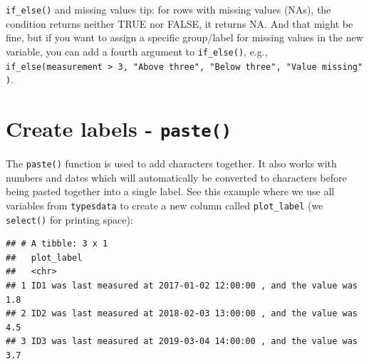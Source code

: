 \documentclass[
  12pt,
  krantz2]{krantz}
\makeatletter
\newenvironment{Shaded}{\begin{snugshade}}{\end{snugshade}}
\newcommand{\DataTypeTok}[1]{\textcolor[rgb]{0.13,0.29,0.53}{#1}}
\newcommand{\KeywordTok}[1]{\textcolor[rgb]{0.13,0.29,0.53}{\textbf{#1}}}
\newcommand{\NormalTok}[1]{#1}
\newcommand{\OperatorTok}[1]{\textcolor[rgb]{0.81,0.36,0.00}{\textbf{#1}}}
\newcommand{\StringTok}[1]{\textcolor[rgb]{0.31,0.60,0.02}{#1}}
\renewenvironment{quote}{\begin{VF}}{\end{VF}}
\newenvironment{kframe}{%
\medskip{}
\setlength{\fboxsep}{.8em}
 \def\at@end@of@kframe{}%
 \ifinner\ifhmode%
  \def\at@end@of@kframe{\end{minipage}}%
  \begin{minipage}{\columnwidth}%
 \fi\fi%
 \def\FrameCommand##1{\hskip\@totalleftmargin \hskip-\fboxsep
 \colorbox{shadecolor}{##1}\hskip-\fboxsep
     \hskip-\linewidth \hskip-\@totalleftmargin \hskip\columnwidth}%
 \MakeFramed {\advance\hsize-\width
   \@totalleftmargin\z@ \linewidth\hsize
   \@setminipage}}%
 {\par\unskip\endMakeFramed%
 \at@end@of@kframe}
\renewenvironment{Shaded}{\begin{kframe}}{\end{kframe}}
\makeatother
\begin{document}
\begin{quote}
\texttt{if\_else()} and missing values tip: for rows with missing values (NAs), the condition returns neither TRUE nor FALSE, it returns NA.
And that might be fine, but if you want to assign a specific group/label for missing values in the new variable, you can add a fourth argument to \texttt{if\_else()}, e.g., \texttt{if\_else(measurement\ \textgreater{}\ 3,\ "Above\ three",\ "Below\ three",\ "Value\ missing")}.
\end{quote}

\hypertarget{create-labels---paste}{%
\section{\texorpdfstring{Create labels - \texttt{paste()}}{Create labels - paste()}}\label{create-labels---paste}}


The \texttt{paste()} function is used to add characters together.
It also works with numbers and dates which will automatically be converted to characters before being pasted together into a single label.
See this example where we use all variables from \texttt{typesdata} to create a new column called \texttt{plot\_label} (we \texttt{select()} for printing space):

\begin{Shaded}
\end{Shaded}

\begin{verbatim}
## # A tibble: 3 x 1
##   plot_label                                                          
##   <chr>                                                               
## 1 ID1 was last measured at 2017-01-02 12:00:00 , and the value was 1.8
## 2 ID2 was last measured at 2018-02-03 13:00:00 , and the value was 4.5
## 3 ID3 was last measured at 2019-03-04 14:00:00 , and the value was 3.7
\end{verbatim}
\end{document}
